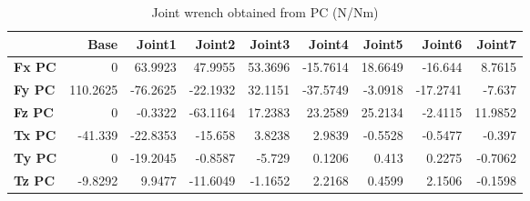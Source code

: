 \begin{table}[h!]
	\centering
	\caption{Joint wrench obtained from PC (N/Nm)}
	\label{wrech_PC_Pose6}
	\begin{tabular}{|l|r|r|r|r|r|r|r|r|}
		\hline
		\textbf{}  & \textbf{Base} & \textbf{Joint1}  & \textbf{Joint2}  & \textbf{Joint3}  & \textbf{Joint4}  & \textbf{Joint5}  & \textbf{Joint6}  & \textbf{Joint7} \\ \hline
		\textbf{Fx PC}  & 0        & 63.9923        & 47.9955        & 53.3696        & -15.7614        & 18.6649        & -16.644        & 8.7615 \\ \hline
		\textbf{Fy PC}  & 110.2625        & -76.2625        & -22.1932        & 32.1151        & -37.5749        & -3.0918        & -17.2741        & -7.637 \\ \hline
		\textbf{Fz PC}  & 0        & -0.3322        & -63.1164        & 17.2383        & 23.2589        & 25.2134        & -2.4115        & 11.9852 \\ \hline
		\textbf{Tx PC}  & -41.339        & -22.8353        & -15.658        & 3.8238        & 2.9839        & -0.5528        & -0.5477        & -0.397 \\ \hline
		\textbf{Ty PC}  & 0        & -19.2045        & -0.8587        & -5.729        & 0.1206        & 0.413        & 0.2275        & -0.7062 \\ \hline
		\textbf{Tz PC}  & -9.8292        & 9.9477        & -11.6049        & -1.1652        & 2.2168        & 0.4599        & 2.1506        & -0.1598 \\ \hline
	\end{tabular}
\end{table}

